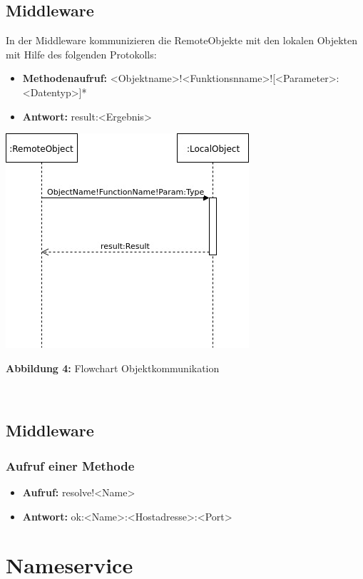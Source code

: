 \subsection{Middleware}
In der Middleware kommunizieren die RemoteObjekte mit den lokalen Objekten mit Hilfe des folgenden Protokolls:
\begin{itemize}
\item \textbf{Methodenaufruf:} <Objektname>!<Funktionsnname>![<Parameter>:<Datentyp>]*
\item \textbf{Antwort:} result:<Ergebnis>
\end{itemize}

\includegraphics[scale=1]{../pictures/FlowChartObjectProtokol.jpg}\\
\centerline{\textbf{Abbildung 4:} Flowchart Objektkommunikation}\\

\subsection{Middleware}
\subsubsection{Aufruf einer Methode}
\begin{itemize}
\item \textbf{Aufruf:} resolve!<Name>
\item \textbf{Antwort:} ok:<Name>:<Hostadresse>:<Port>
\end{itemize}
 
\section{Nameservice}

